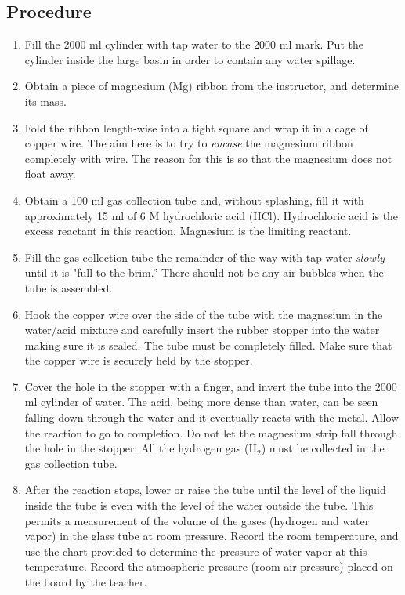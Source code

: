 \documentclass[11pt]{article}
\begin{document}
\subsection{Procedure}
\begin{enumerate}
	\item Fill the 2000 ml cylinder with tap water to the 2000 ml mark. Put the cylinder inside the large basin in order to contain any water spillage. 

	\item Obtain a piece of magnesium (Mg) ribbon from the instructor, and determine its mass. 
	\item Fold the ribbon length-wise into a tight square and wrap it in a cage of copper wire. The aim here is to try to \textit{encase} the magnesium ribbon completely with wire. The reason for this is so that the magnesium does not float away. 
	\item Obtain a 100 ml gas collection tube and, without splashing, fill it with approximately 15 ml of 6 M hydrochloric acid (HCl). Hydrochloric acid is the excess reactant in this reaction. Magnesium is the limiting reactant. 

	\item Fill the gas collection tube the remainder of the way with tap water \textit{slowly} until it is "full-to-the-brim.” There should not be any air bubbles when the tube is assembled.

	\item Hook the copper wire over the side of the tube with the magnesium in the water/acid mixture and carefully insert the rubber stopper into the water making sure it is sealed. The tube must be completely filled. Make sure that the copper wire is securely held by the stopper. 

	\item Cover the hole in the stopper with a finger, and invert the tube into the 2000 ml cylinder of water. The acid, being more dense than water, can be seen falling down through the water and it eventually reacts with the metal. Allow the reaction to go to completion. Do not let the magnesium strip fall through the hole in the stopper. All the hydrogen gas (H$_{2}$) must be collected in the gas collection tube. 
	 
	\item After the reaction stops, lower or raise the tube until the level of the liquid inside the tube is even with the level of the water outside the tube. This permits a measurement of the volume of the gases (hydrogen and water vapor) in the glass tube at room pressure. Record the room temperature, and use the chart provided to determine the pressure of water vapor at this temperature. Record the atmospheric pressure (room air pressure) placed on the board by the teacher. 
	 

\end{enumerate}
\end{document}
